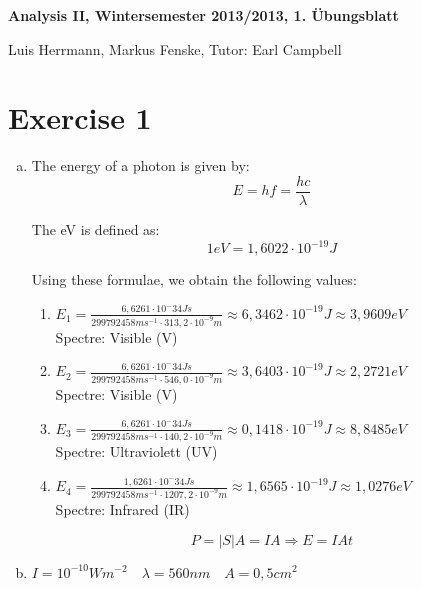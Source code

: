 \documentclass[a4paper,german,12pt]{scrartcl}
\begin{document}
\begin{center}
\bfseries %
\sffamily %
\vspace{-40pt}
Analysis II, Wintersemester 2013/2013, 1. Übungsblatt

Luis Herrmann, Markus Fenske, Tutor: Earl Campbell
\vspace{-10pt}
\end{center}

\section*{Exercise 1}

\begin{enumerate}[(a)]
\item The energy of a photon is given by:
\begin{equation*}
E=hf=\frac{hc}{\lambda}
\end{equation*}

The eV is defined as:
\begin{equation*}
1eV=1,6022\cdot 10^{-19}J
\end{equation*}

Using these formulae, we obtain the following values:

\begin{enumerate}
\item $E_1=\frac{6,6261\cdot 10^-34 Js}{299792458ms^{-1}\cdot 313,2\cdot 10^{-9}m}\approx 6,3462\cdot 10^{-19}J\approx3,9609eV$\\
Spectre: Visible (V)
\item $E_2=\frac{6,6261\cdot 10^-34 Js}{299792458ms^{-1}\cdot 546,0\cdot 10^{-9}m}\approx 3,6403\cdot 10^{-19}J\approx2,2721eV$\\
Spectre: Visible (V)
\item $E_3=\frac{6,6261\cdot 10^-34 Js}{299792458ms^{-1}\cdot 140,2\cdot 10^{-9}m}\approx 0,1418\cdot 10^{-19}J\approx8,8485eV$\\
Spectre: Ultraviolett (UV)
\item $E_4=\frac{1,6261\cdot 10^-34 Js}{299792458ms^{-1}\cdot 1207,2\cdot 10^{-9}m}\approx 1,6565\cdot 10^{-19}J\approx1,0276eV$\\
Spectre: Infrared (IR)
\end{enumerate}


\begin{equation*}
P=|S|A=IA \Rightarrow E=IAt
\end{equation*}

\item $I=10^{-10}Wm^{-2} \quad \lambda=560nm \quad A=0,5cm^2$


\end{enumerate}
\end{document}
